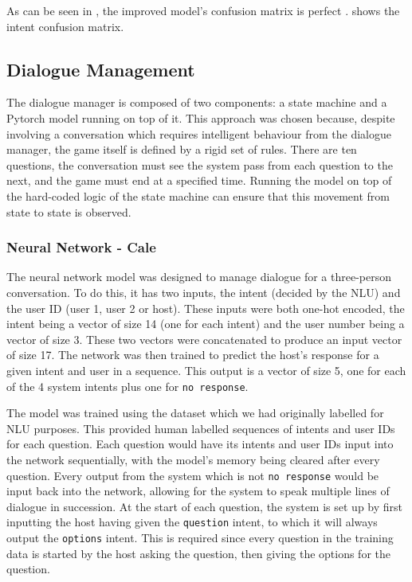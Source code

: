 \documentclass[hidelinks, 11pt]{article}
\begin{document}
As can be seen in , the improved model's confusion matrix is perfect .  shows the intent confusion matrix.

\subsection{Dialogue Management}
\label{subsec:dialogue_management}

The dialogue manager is composed of two components: a state machine and a Pytorch model running on top of it. This approach was chosen because, despite involving a conversation which requires intelligent behaviour from the dialogue manager, the game itself is defined by a rigid set of rules. There are ten questions, the conversation must see the system pass from each question to the next, and the game must end at a specified time. Running the model on top of the hard-coded logic of the state machine can ensure that this movement from state to state is observed. 

\subsubsection{Neural Network - Cale}
\label{subsec:nn}
The neural network model was designed to manage dialogue for a three-person conversation. To do this, it has two inputs, the intent (decided by the NLU) and the user ID (user 1, user 2 or host). These inputs were both one-hot encoded, the intent being a vector of size 14 (one for each intent) and the user number being a vector of size 3. These two vectors were concatenated to produce an input vector of size 17. The network was then trained to predict the host's response for a given intent and user in a sequence. This output is a vector of size 5, one for each of the 4 system intents plus one for \verb|no response|.

The model was trained using the dataset which we had originally labelled for NLU purposes. This provided human labelled sequences of intents and user IDs for each question. Each question would have its intents and user IDs input into the network sequentially, with the model's memory being cleared after every question. Every output from the system which is not \verb|no response| would be input back into the network, allowing for the system to speak multiple lines of dialogue in succession. At the start of each question, the system is set up by first inputting the host having given the \verb|question| intent, to which it will always output the \verb|options| intent. This is required since every question in the training data is started by the host asking the question, then giving the options for the question.
\end{document}
